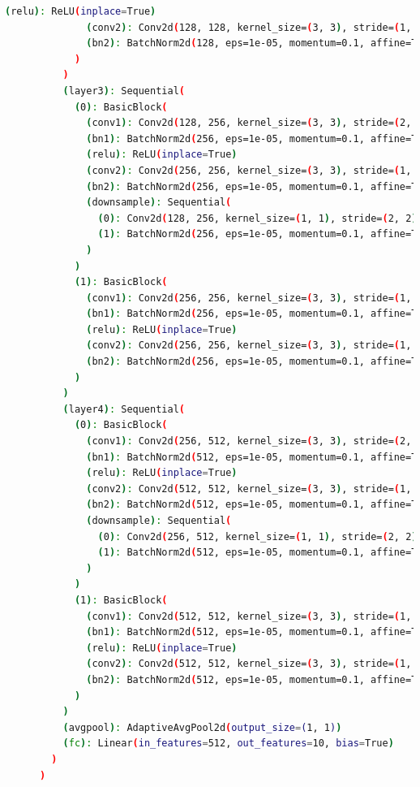 \documentclass[a4paper, 12pt]{article}
\begin{document}
\begin{lstlisting}[language=sh]
              (relu): ReLU(inplace=True)
              (conv2): Conv2d(128, 128, kernel_size=(3, 3), stride=(1, 1), padding=(1, 1), bias=False)
              (bn2): BatchNorm2d(128, eps=1e-05, momentum=0.1, affine=True, track_running_stats=True)
            )
          )
          (layer3): Sequential(
            (0): BasicBlock(
              (conv1): Conv2d(128, 256, kernel_size=(3, 3), stride=(2, 2), padding=(1, 1), bias=False)
              (bn1): BatchNorm2d(256, eps=1e-05, momentum=0.1, affine=True, track_running_stats=True)
              (relu): ReLU(inplace=True)
              (conv2): Conv2d(256, 256, kernel_size=(3, 3), stride=(1, 1), padding=(1, 1), bias=False)
              (bn2): BatchNorm2d(256, eps=1e-05, momentum=0.1, affine=True, track_running_stats=True)
              (downsample): Sequential(
                (0): Conv2d(128, 256, kernel_size=(1, 1), stride=(2, 2), bias=False)
                (1): BatchNorm2d(256, eps=1e-05, momentum=0.1, affine=True, track_running_stats=True)
              )
            )
            (1): BasicBlock(
              (conv1): Conv2d(256, 256, kernel_size=(3, 3), stride=(1, 1), padding=(1, 1), bias=False)
              (bn1): BatchNorm2d(256, eps=1e-05, momentum=0.1, affine=True, track_running_stats=True)
              (relu): ReLU(inplace=True)
              (conv2): Conv2d(256, 256, kernel_size=(3, 3), stride=(1, 1), padding=(1, 1), bias=False)
              (bn2): BatchNorm2d(256, eps=1e-05, momentum=0.1, affine=True, track_running_stats=True)
            )
          )
          (layer4): Sequential(
            (0): BasicBlock(
              (conv1): Conv2d(256, 512, kernel_size=(3, 3), stride=(2, 2), padding=(1, 1), bias=False)
              (bn1): BatchNorm2d(512, eps=1e-05, momentum=0.1, affine=True, track_running_stats=True)
              (relu): ReLU(inplace=True)
              (conv2): Conv2d(512, 512, kernel_size=(3, 3), stride=(1, 1), padding=(1, 1), bias=False)
              (bn2): BatchNorm2d(512, eps=1e-05, momentum=0.1, affine=True, track_running_stats=True)
              (downsample): Sequential(
                (0): Conv2d(256, 512, kernel_size=(1, 1), stride=(2, 2), bias=False)
                (1): BatchNorm2d(512, eps=1e-05, momentum=0.1, affine=True, track_running_stats=True)
              )
            )
            (1): BasicBlock(
              (conv1): Conv2d(512, 512, kernel_size=(3, 3), stride=(1, 1), padding=(1, 1), bias=False)
              (bn1): BatchNorm2d(512, eps=1e-05, momentum=0.1, affine=True, track_running_stats=True)
              (relu): ReLU(inplace=True)
              (conv2): Conv2d(512, 512, kernel_size=(3, 3), stride=(1, 1), padding=(1, 1), bias=False)
              (bn2): BatchNorm2d(512, eps=1e-05, momentum=0.1, affine=True, track_running_stats=True)
            )
          )
          (avgpool): AdaptiveAvgPool2d(output_size=(1, 1))
          (fc): Linear(in_features=512, out_features=10, bias=True)
        )
      )
\end{lstlisting}
\end{document}

